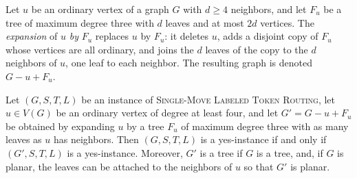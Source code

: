 \documentclass[a4paper,USenglish,thm-restate]{lipics-v2021}
\theoremstyle{problemstyle}
\begin{document}
Let $u$ be an ordinary vertex of a graph $G$ with $d\ge 4$ neighbors, and let
$F_u$ be a tree of maximum degree three with $d$ leaves and at most $2d$
vertices. The \emph{expansion} of $u$ \emph{by} $F_u$ replaces $u$ by $F_u$: it
deletes $u$, adds a disjoint copy of $F_u$ whose vertices are all ordinary, and
joins the $d$ leaves of the copy to the $d$ neighbors of $u$, one leaf to each
neighbor. The resulting graph is denoted $G-u+F_u$.

\begin{lemma}\label{lem:subcubic-expansion}
Let $(G,S,T,L)$ be an instance of \textsc{Single-Move Labeled Token Routing},
let $u\in V(G)$ be an ordinary vertex of degree at least four, and let $G'=G-u+F_u$
be obtained by expanding $u$ by a tree $F_u$ of maximum degree three with as
many leaves as $u$ has neighbors. Then $(G,S,T,L)$ is a
yes-instance if and only if $(G',S,T,L)$ is a yes-instance. Moreover, $G'$ is
a tree if $G$ is a tree, and, if $G$ is planar, the leaves can be attached
to the neighbors of $u$ so that $G'$ is planar.
\end{lemma}
\end{document}
